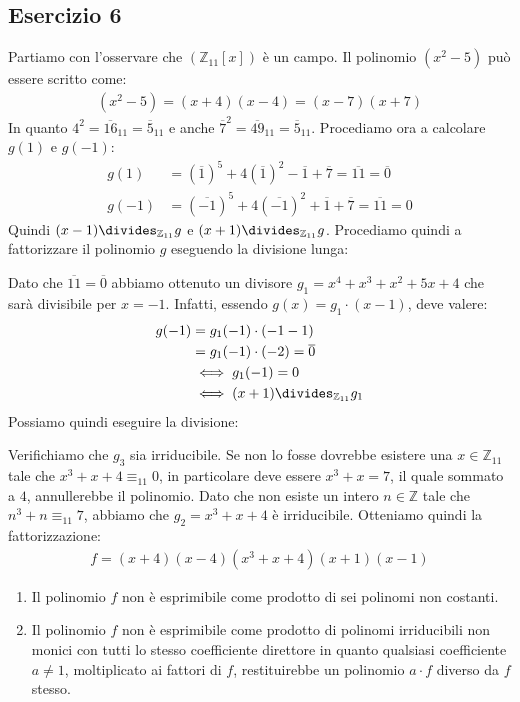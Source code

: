 \subsection*{Esercizio 6}
Partiamo con l'osservare che $(\mathbb{Z}_{11}[x])$ è un campo. Il polinomio $(x^{2}-5)$ può essere scritto come:
\begin{align*}
	(x^{2}-5) = (x+4)(x-4) = (x-7)(x+7)
\end{align*} 
In quanto $4^{2} = \overline{16}_{11} = \overline{5}_{11}$ e anche $\overline{7}^{2} = \overline{49}_{11} = \overline{5}_{11}$.
Procediamo ora a calcolare $g(1)$ e $g(-1)$:
\begin{align*}
	g(1)&=(\overline{1})^{5}+4(\overline{1})^{2}-\overline{1}+\overline{7}=\overline{11}=\overline{0} \\
	g(-1) &= (\overline{-1})^{5} + 4(\overline{-1})^{2} + \overline{1} +\overline{7} = \overline{11} = 0
\end{align*}
Quindi $(x-1) \divides_{\mathbb{Z}_{11}} g$ e $(x+1) \divides_{\mathbb{Z}_{11}} g$. Procediamo quindi a fattorizzare il polinomio $g$ eseguendo la divisione lunga:
\begin{center}
\end{center}
Dato che $\overline{11}=\overline{0}$ abbiamo ottenuto un divisore $g_{1}=x^{4}+x^{3}+x^{2}+5x+4$ che sarà divisibile per $x=-1$. Infatti, essendo $g(x) =g_{1} \cdot (x-1)$, deve valere:
\begin{align*}
	g(-1) &= g_{1}(-1) \cdot (-1 - 1) \\
	&= g_{1}(-1) \cdot (-2) = \overline{0}	\\
	&\iff g_{1}(-1) = 0 \\
	&\iff (x+1) \divides_{\mathbb{Z}_{11}} g_{1}
\end{align*}
Possiamo quindi eseguire la divisione:
\begin{center}
\end{center}
Verifichiamo che $g_{3}$ sia irriducibile. Se non lo fosse dovrebbe esistere una $x \in \mathbb{Z}_{11}$ tale che $x^{3}+x+4\equiv_{11} 0$, in particolare deve essere $x^{3}+x=7$, il quale sommato a $4$, annullerebbe il polinomio. Dato che non esiste un intero $n \in \mathbb{Z}$ tale che $n^{3}+n \equiv_{11} 7$, abbiamo che $g_{2} = x^{3}+x+4$ è irriducibile. Otteniamo quindi la fattorizzazione:
\begin{align*}
	f = (x+4)(x-4)(x^{3}+x+4)(x+1)(x-1)
\end{align*}
\begin{enumerate}[label=(\textit{\roman*})]
	\item Il polinomio $f$ non è esprimibile come prodotto di sei polinomi non costanti.
	\item Il polinomio $f$ non è esprimibile come prodotto di polinomi irriducibili non monici con tutti lo stesso coefficiente direttore in quanto qualsiasi coefficiente $a \neq 1$, moltiplicato ai fattori di $f$, restituirebbe un polinomio $a \cdot f$ diverso da $f$ stesso.
\end{enumerate}
\vfill

